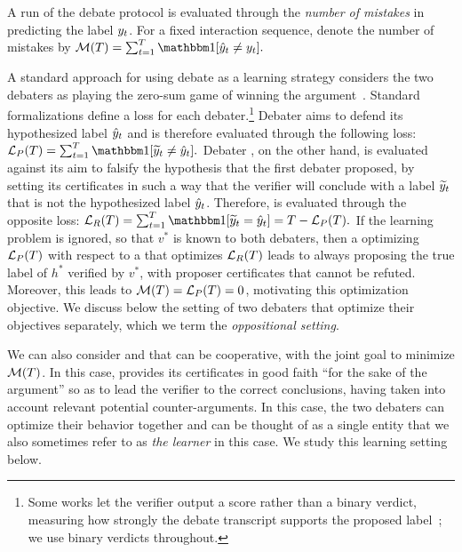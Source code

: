 \documentclass[11pt,letterpaper]{article}
\theoremstyle{definition}
\theoremstyle{plain}
\begin{document}
A run of the debate protocol is evaluated through the \emph{number of mistakes} in predicting the label $y_t$. For a fixed interaction sequence, denote the number of mistakes by
$\Mi(T) = \sum_{t = 1}^T \indct[\hy_t \neq \ty_t].$





A standard approach for using debate as a learning strategy considers the two debaters as playing the zero-sum game of winning the argument~\citep{irving2018debate,chen2023playing,browncohen2024debate,browncohen2025prover}.
Standard formalizations \citep{irving2018debate,browncohen2024debate} define a loss for each debater.\footnote{Some works let the verifier output a score rather than a binary verdict, measuring how strongly the debate transcript supports the proposed label~\citep{chen2023playing,arnesen2024training,browncohen2025prover}; we use binary verdicts throughout.} Debater \dt aims to defend its hypothesized label ${\hat{y}}_t$ and is therefore evaluated through the following loss: $\tLo(T) = \sum_{t = 1}^T \indct[\vy_t \neq \hy_t].$ 
Debater \df, on the other hand, is evaluated against its aim to falsify the hypothesis that the first debater proposed, by setting its certificates in such a way that the verifier will conclude with a label ${\widetilde{y}}_t$ that is not the hypothesized label ${\hat{y}}_t$. 
Therefore, \df is evaluated through the opposite loss: 
 $\fLo(T) = \sum_{t = 1}^T \indct[\vy_t = \hy_t] = T - \tLo(T).$
If the learning problem is ignored, so that $v^*$ is known to both debaters, then a \dt optimizing ${{\mathcal L}_P}(T)$ with respect to a \df that optimizes ${{\mathcal L}_R}(T)$ leads to \dt always proposing the true label of $h^*$ verified by $v^*$, with proposer certificates that cannot be refuted. Moreover, this leads to ${\mathcal M}(T) = {{\mathcal L}_P}(T) = 0$, motivating this optimization objective. We discuss below the setting of two debaters that optimize their objectives separately, which we term the \emph{oppositional setting}. 

We can also consider \dt and \df that can be cooperative, with the joint goal to minimize ${\mathcal M}(T)$. 
In this case, \df provides its certificates in good faith ``for the sake of the argument'' so as to lead the verifier to the correct conclusions, having taken into account relevant potential counter-arguments. In this case, the two debaters can optimize their behavior together and can be thought of as a single entity that we also sometimes refer to as \emph{the learner} in this case. We study this learning setting below.
\end{document}
